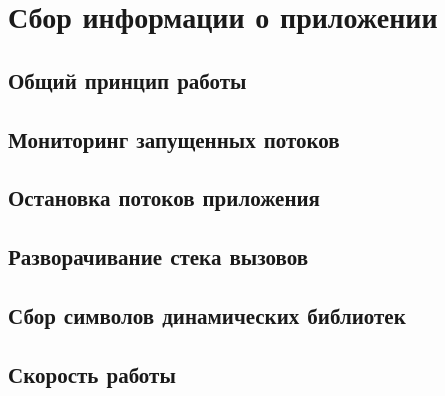 
\chapter{Сбор информации о приложении}
\section{Общий принцип работы}
\section{Мониторинг запущенных потоков}
\section{Остановка потоков приложения}
\section{Разворачивание стека вызовов}
\section{Сбор символов динамических библиотек}
\section{Скорость работы}
\chapterconclusion
